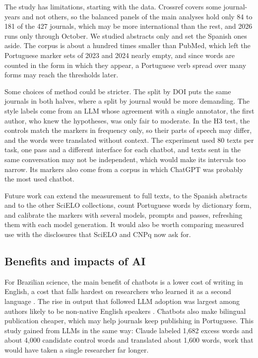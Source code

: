 \documentclass[12pt]{article}
\begin{document}
The study has limitations, starting with the data. Crossref covers some journal-years and not
others, so the balanced panels of the main analyses hold only 84 to 181 of the 427 journals, which
may be more international than the rest, and 2026 runs only through October. We studied abstracts
only and set the Spanish ones aside. The corpus is about a hundred times smaller than PubMed, which
left the Portuguese marker sets of 2023 and 2024 nearly empty, and since words are counted in the
form in which they appear, a Portuguese verb spread over many forms may reach the thresholds later.

Some choices of method could be stricter. The split by DOI puts the same journals in both halves,
where a split by journal \cite{lee2026korean} would be more demanding. The style labels come from
an LLM whose agreement with a single annotator, the first author, who knew the hypotheses, was only
fair to moderate. In the H3 test, the controls match the markers in frequency only, so their parts
of speech may differ, and the words were translated without context. The experiment used 80 texts
per task, one pass and a different interface for each chatbot, and texts sent in the same
conversation may not be independent, which would make its intervals too narrow. Its markers also
come from a corpus in which ChatGPT was probably the most used chatbot.

Future work can extend the measurement to full texts, to the Spanish abstracts and to the other
SciELO collections, count Portuguese words by dictionary form, and calibrate the markers with
several models, prompts and passes, refreshing them with each model generation. It would also be
worth comparing measured use with the disclosures that SciELO and CNPq now ask for.

\subsection{Benefits and impacts of AI}
\label{sec:impacts}

For Brazilian science, the main benefit of chatbots is a lower cost of writing in English, a cost
that falls hardest on researchers who learned it as a second language
\cite{amano2023manifold,berdejoespinola2023ai}. The rise in output that followed LLM adoption was
largest among authors likely to be non-native English speakers \cite{kusumegi2026scientific}.
Chatbots also make bilingual publication cheaper, which may help journals keep publishing in
Portuguese. This study gained from LLMs in the same way: Claude labeled 1,682 excess words and
about 4,000 candidate control words and translated about 1,600 words, work that would have taken a
single researcher far longer.
\end{document}
